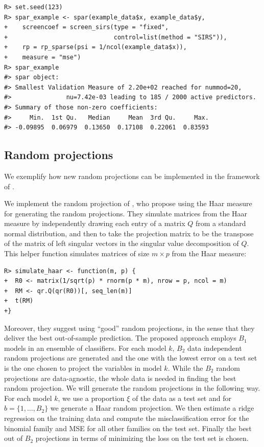 \documentclass[
  article,
  nojss]{jss}
\begin{document}
\begin{verbatim}
R> set.seed(123)      
R> spar_example <- spar(example_data$x, example_data$y,
+    screencoef = screen_sirs(type = "fixed",
+                             control=list(method = "SIRS")),
+    rp = rp_sparse(psi = 1/ncol(example_data$x)),
+    measure = "mse")
R> spar_example
#> spar object:
#> Smallest Validation Measure of 2.20e+02 reached for nummod=20,
#>               nu=7.42e-03 leading to 185 / 2000 active predictors.
#> Summary of those non-zero coefficients:
#>     Min.  1st Qu.   Median     Mean  3rd Qu.     Max. 
#> -0.09895  0.06979  0.13650  0.17108  0.22061  0.83593
\end{verbatim}

\subsection{Random projections}\label{random-projections-1}

We exemplify how new random projections can be implemented in the
framework of .

We implement the random projection of \citet{cannings2017random}, who
propose using the Haar measure for generating the random projections.
They simulate matrices from the Haar measure by independently drawing
each entry of a matrix \(Q\) from a standard normal distribution, and
then to take the projection matrix to be the transpose of the matrix of
left singular vectors in the singular value decomposition of \(Q\). This
helper function simulates matrices of size \(m\times p\) from the Haar
measure:

\begin{verbatim}
R> simulate_haar <- function(m, p) {
+  R0 <- matrix(1/sqrt(p) * rnorm(p * m), nrow = p, ncol = m)
+  RM <- qr.Q(qr(R0))[, seq_len(m)]
+  t(RM)
+}
\end{verbatim}

Moreover, they suggest using ``good'' random projections, in the sense
that they deliver the best out-of-sample prediction. The proposed
approach employs \(B_1\) models in an ensemble of classifiers. For each
model \(k\), \(B_2\) data independent random projections are generated
and the one with the lowest error on a test set is the one chosen to
project the variables in model \(k\). While the \(B_2\) random
projections are data-agnostic, the whole data is needed in finding the
best random projection. We will generate the random projections in the
following way. For each model \(k\), we use a proportion \(\xi\) of the
data as a test set and for \(b=\{1,\ldots,B_2\}\) we generate a Haar
random projection. We then estimate a ridge regression on the training
data and compute the misclassification error for the binomial family and
MSE for all other families on the test set. Finally the best out of
\(B_2\) projections in terms of minimizing the loss on the test set is
chosen.
\end{document}

